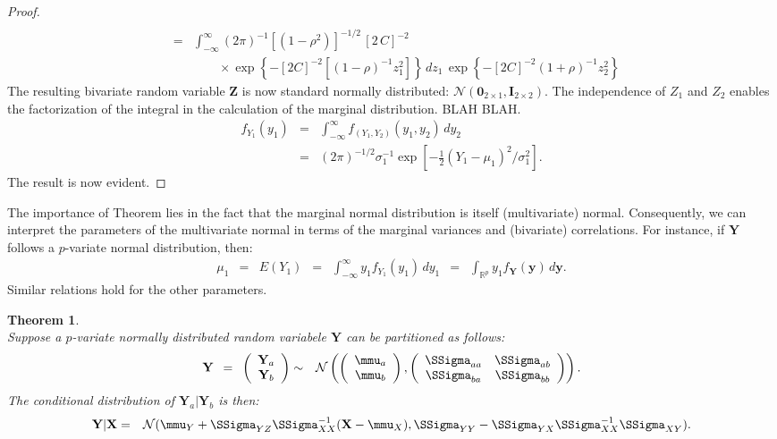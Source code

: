 \documentclass[a4paper]{article}
\theoremstyle{myexamplestyle}
\newtheorem{ther}{Theorem}
\begin{document}
\begin{proof}
\begin{eqnarray*}
\\
& = & \int_{-\infty}^{\infty} (2 \pi)^{-1} [(1-\rho^2)]^{-1/2} \, [2 \, C]^{-2}
\\
& & \qquad \times \exp \left\{ - [ 2 C ]^{-2} [ (1-\rho)^{-1} z_1^2 ]  \right\} \, d z_1 \, 
\exp \left\{ -[  2 C ]^{-2} (1+\rho)^{-1} z_2^2   \right\}
\end{eqnarray*}
The resulting bivariate random variable $ \mathbf{Z}$ is now standard normally distributed: $\mathcal{N}( \mathbf{0}_{2 \times 1}, \mathbf{I}_{2 \times 2})$. The independence of $Z_1$ and $Z_2$ enables the factorization of the integral in the calculation of the marginal distribution. BLAH BLAH.
\begin{eqnarray*}
f_{Y_1}(y_1) & = & \int_{-\infty}^{\infty} f_{(Y_1, Y_2)}(y_1, y_2) \, d y_2
\\
& = & (2 \pi)^{-1/2} \sigma_1^{-1} \exp[ - \frac{1}{2} (Y_1 - \mu_1)^2 / \sigma_1^2 ].
\end{eqnarray*}
The result is now evident.
\end{proof}

The importance of Theorem lies in the fact that the marginal normal distribution is itself (multivariate) normal. Consequently, we can interpret the parameters of the multivariate normal in terms of the marginal variances and (bivariate) correlations. For instance, if $\mathbf{Y}$ follows a $p$-variate normal distribution, then:
\begin{eqnarray*}
\mu_1 & = & E(Y_1) \, \, \, = \, \, \, \int_{-\infty}^{\infty} y_1 f_{Y_1}(y_1) \, dy_1 \, \, \, = \, \, \, \int_{\mathbb{R}^p} y_1 f_{\mathbf{Y}}(\mathbf{y}) \, d \mathbf{y}.
\end{eqnarray*}
Similar relations hold for the other parameters.



\begin{ther} \label{theo.cond.dist.normal} \mbox{ }
\\
Suppose a $p$-variate normally distributed random variabele $\mathbf{Y}$ can be partitioned as follows:
\begin{eqnarray*}
\mathbf{Y} \, \, \, = \, \, \,
\left(
\begin{array}{c}
\mathbf{Y}_a
\\
\mathbf{Y}_b
\end{array}
\right)
& \sim & \mathcal{N} \left(
\left(
\begin{array}{c}
\mmu_a
\\
\mmu_b
\end{array}
\right),
\left(
\begin{array}{cc}
\SSigma_{aa} & \SSigma_{ab}
\\
\SSigma_{ba} & \SSigma_{bb}
\end{array}
\right)
\right).
\end{eqnarray*}
The conditional distribution of $\mathbf{Y}_a | \mathbf{Y}_b$ is then:
\begin{eqnarray*}
\mathbf{Y} | \mathbf{X} & = &  \mathcal{N}(\mmu_Y + \SSigma_{YZ} \SSigma_{XX}^{-1} (\mathbf{X} - \mmu_X),
\SSigma_{YY} - \SSigma_{YX} \SSigma_{XX}^{-1} \SSigma_{XY}).
\end{eqnarray*}
\end{ther}
\end{document}
